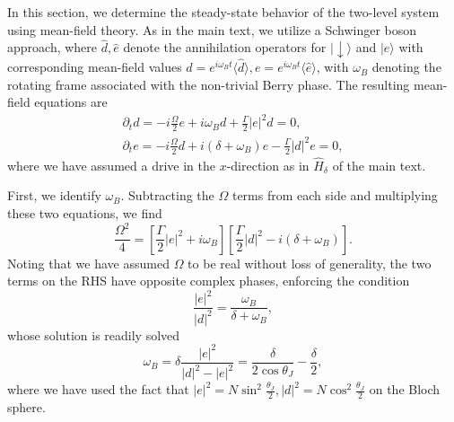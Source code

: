 In this section, we determine the steady-state behavior of the two-level system using mean-field theory. As in the main text, we utilize a Schwinger boson approach, where $\hat d, \hat e$ denote the annihilation operators for $|{\downarrow}\rangle$ and $|e\rangle$ with corresponding mean-field values $d = e^{i \omega_Bt} \langle \hat d \rangle, e = e^{i \omega_Bt}  \langle \hat e \rangle$, with $\omega_B$ denoting the rotating frame associated with the non-trivial Berry phase. The resulting mean-field equations are
\begin{subequations}
    \begin{gather}
    \label{eq:MFTg}
        \partial_t d = - i \frac{\Omega}{2} e + i \omega_B d + \frac{\Gamma}{2} |e|^2 d = 0,\\
    \label{eq:MFTe}
        \partial_t e = - i \frac{\Omega}{2} d + i (\delta + \omega_B) e - \frac{\Gamma}{2} |d|^2 e = 0,
    \end{gather}
\end{subequations}
where we have assumed a drive in the $x$-direction as in $\hat H_\delta$ of the main text.

First, we identify $\omega_B$. Subtracting the $\Omega$ terms from each side and multiplying these two equations, we find
\begin{equation}
    \frac{\Omega^2}{4} = \left[ \frac{\Gamma}{2} |e|^2 + i \omega_B\right] \left[ \frac{\Gamma}{2} |d|^2 - i (\delta + \omega_B) \right].
\end{equation}
Noting that we have assumed $\Omega$ to be real without loss of generality, the two terms on the RHS have opposite complex phases, enforcing the condition
\begin{equation}
    \frac{|e|^2}{|d|^2} = \frac{\omega_B}{\delta + \omega_B},
\end{equation}
whose solution is readily solved
\begin{equation}
    \omega_B= \delta \frac{|e|^2}{|d|^2-|e|^2} = \frac{\delta}{2 \cos \theta_J} - \frac{\delta}{2},
\end{equation}
where we have used the fact that $|e|^2 = N \sin^2\frac{\theta_J}{2}, |d|^2 = N \cos^2 \frac{\theta_J}{2}$ on the Bloch sphere.

